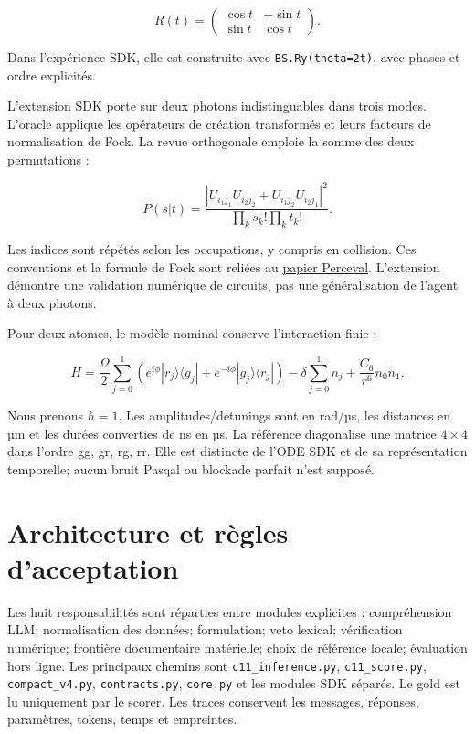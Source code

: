 \documentclass[11pt]{article}
\begin{document}
\[R(t)=\begin{pmatrix}\cos t&-\sin t\\\sin t&\cos t\end{pmatrix}.\]

Dans l'expérience SDK, elle est construite avec \texttt{BS.Ry(theta=2t)}, avec phases et ordre explicités.

L'extension SDK porte sur deux photons indistinguables dans trois modes. L'oracle applique les opérateurs de création transformés et leurs facteurs de normalisation de Fock. La revue orthogonale emploie la somme des deux permutations :

\[P(s|t)=\frac{|U_{i_1j_1}U_{i_2j_2}+U_{i_1j_2}U_{i_2j_1}|^2}{\prod_k s_k!\prod_k t_k!}.\]

Les indices sont répétés selon les occupations, y compris en collision. Ces conventions et la formule de Fock sont reliées au \href{\detokenize{https://arxiv.org/html/2204.00602}}{papier Perceval}. L'extension démontre une validation numérique de circuits, pas une généralisation de l'agent à deux photons.

Pour deux atomes, le modèle nominal conserve l'interaction finie :

\[H=\frac{\Omega}{2}\sum_{j=0}^1(e^{i\phi}|r_j\rangle\langle g_j|+e^{-i\phi}|g_j\rangle\langle r_j|)-\delta\sum_{j=0}^1n_j+\frac{C_6}{r^6}n_0n_1.\]

Nous prenons $\hbar=1$. Les amplitudes/detunings sont en rad/µs, les distances en µm et les durées converties de ns en µs. La référence diagonalise une matrice $4\times4$ dans l'ordre gg, gr, rg, rr. Elle est distincte de l'ODE SDK et de sa représentation temporelle; aucun bruit Pasqal ou blockade parfait n'est supposé.

\section{Architecture et règles d'acceptation}

Les huit responsabilités sont réparties entre modules explicites : compréhension LLM; normalisation des données; formulation; veto lexical; vérification numérique; frontière documentaire matérielle; choix de référence locale; évaluation hors ligne. Les principaux chemins sont \texttt{c11\_inference.py}, \texttt{c11\_score.py}, \texttt{compact\_v4.py}, \texttt{contracts.py}, \texttt{core.py} et les modules SDK séparés. Le gold est lu uniquement par le scorer. Les traces conservent les messages, réponses, paramètres, tokens, temps et empreintes.
\end{document}
